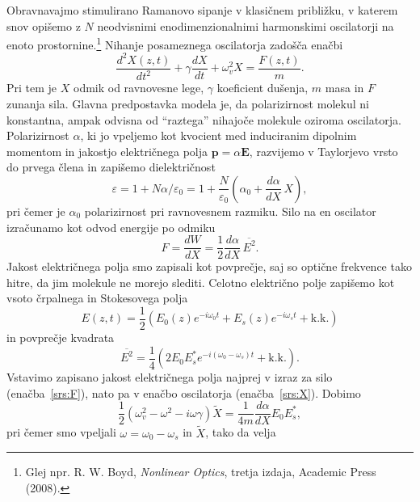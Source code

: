 Obravnavajmo stimulirano Ramanovo sipanje v klasičnem približku, v katerem snov opišemo 
z $N$ neodvisnimi enodimenzionalnimi harmonskimi oscilatorji na enoto prostornine.\footnote{Glej npr. 
R. W. Boyd, {\it Nonlinear Optics}, tretja izdaja, Academic Press (2008).} Nihanje
posameznega oscilatorja zadošča enačbi
\begin{equation}
\frac{d^2X(z,t)}{dt^2}+ \gamma \frac{dX}{dt}+\omega_v^2X = \frac{F(z,t)}{m}.
\label{srs:X}
\end{equation}
Pri tem je $X$ odmik od ravnovesne lege, $\gamma$ koeficient dušenja, $m$ masa in $F$ zunanja sila.
Glavna predpostavka modela je, da polarizirnost molekul ni konstantna, ampak odvisna od 
``raztega'' nihajoče molekule oziroma oscilatorja. Polarizirnost $\alpha$, ki jo vpeljemo
kot kvocient med induciranim dipolnim momentom in jakostjo električnega polja $\mathbf{p} = \alpha \mathbf{E}$,
razvijemo v Taylorjevo vrsto do prvega člena in zapišemo dielektričnost
\begin{equation}
\varepsilon = 1+N\alpha/\varepsilon_0 = 1+\frac{N}{\varepsilon_0}\left(\alpha_0 + \frac{d\alpha}{dX}\,X\right),
\label{srs:a}
\end{equation}
pri čemer je $\alpha_0$ polarizirnost pri ravnovesnem razmiku.
Silo na en oscilator izračunamo kot odvod energije po odmiku
\begin{equation}
F = \frac{dW}{dX}= \frac{1}{2}\frac{d\alpha}{dX}\,\overline{E^2}.
\label{srs:F}
\end{equation}
Jakost električnega polja smo zapisali kot povprečje, saj so optične frekvence 
tako hitre, da jim molekule ne morejo slediti. 
Celotno električno polje zapišemo kot vsoto črpalnega in Stokesovega polja
\begin{equation}
E(z,t)= \frac{1}{2}\left( E_0(z)e^{-i\omega_0t}+ E_s(z)e^{-i\omega_st} + \mathrm{k.k.}\right)
\label{eq:srsE}
\end{equation}
in povprečje kvadrata
\begin{equation}
\overline{E^2} = \frac{1}{4}\left(2E_0E_s^* e^{-i(\omega_0-\omega_s)t}+\mathrm{k.k.}\right).
\end{equation}
Vstavimo zapisano jakost električnega polja najprej v izraz za silo (enačba~\ref{srs:F}),
nato pa v enačbo oscilatorja (enačba~\ref{srs:X}). Dobimo
\begin{equation}
\frac{1}{2}\left(\omega_v^2-\omega^2-i\omega\gamma\right)\tilde{X} = 
\frac{1}{4m}\frac{d\alpha}{dX}E_0 E_s^*,
\end{equation}
pri čemer smo vpeljali $\omega = \omega_0-\omega_s$ in $\tilde{X}$, tako da velja
